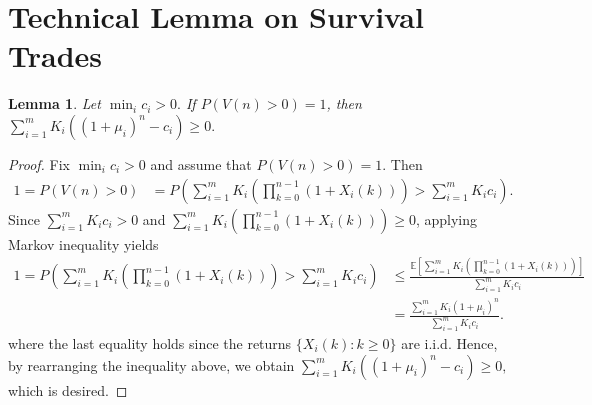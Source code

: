 \documentclass[10pt]{article} %
\newtheorem{lemma}{Lemma}[section]
\begin{document}
	
	
	    
	
	\appendix
	\section{Technical Lemma on Survival Trades}
	
	
	\begin{lemma} \label{lemma: second surivial lemma}
		Let $\min_i c_i >0.$
		If $P(V(n) >0)=1$, then $\sum_{i=1}^m K_i ((1+\mu_i)^n - c_i) \geq 0.$
	\end{lemma}
	
	
	\begin{proof} 
		Fix $\min_i c_i>0$ and assume that $P(V(n)>0) = 1$. Then
		\begin{align*}
			1 = P(V(n)>0) 
			&= P\left( \sum_{i=1}^m K_i\left(   \prod_{k=0}^{n-1} (1+ X_i(k))  \right) > \sum_{i=1}^m K_i  c_i    \right).
		\end{align*}
		Since $\sum_{i=1}^m K_i  c_i >0$ and $\sum_{i=1}^m K_i\left(   \prod_{k=0}^{n-1} (1+ X_i(k))  \right) \geq 0$, applying Markov inequality yields
		\begin{align*}
			1 = P\left( \sum_{i=1}^m K_i\left(   \prod_{k=0}^{n-1} (1+ X_i(k))  \right) > \sum_{i=1}^m K_i  c_i    \right) 
			&\leq \frac{ \mathbb{E}\left[ \sum_{i=1}^m K_i\left(   \prod_{k=0}^{n-1} (1+ X_i(k)) \right) \right]}{\sum_{i=1}^m K_i c_i} \\
			&= \frac{ \sum_{i=1}^m K_i (1+ \mu_i)^n }{ \sum_{i=1}^m K_i c_i}.
		\end{align*}
		where the last equality holds since the returns $\{X_i(k): k \geq 0\}$ are i.i.d.
		Hence, by rearranging the inequality above, we obtain
		$
		\sum_{i=1}^m K_i  ((1+\mu_i)^n -c_i ) \geq 0,
		$ which is desired.
	\end{proof}
\end{document}
